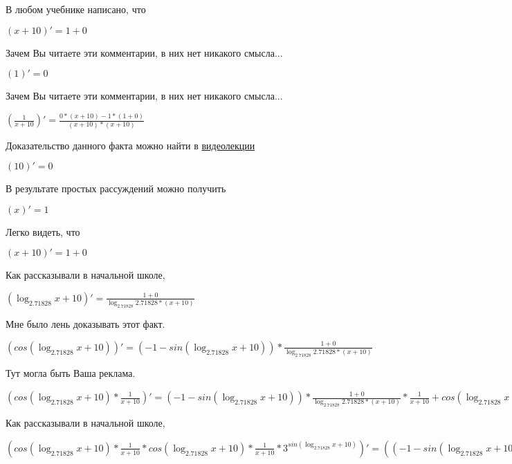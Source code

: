 \documentclass[12pt,a4paper,fleqn]{article}
\theoremstyle{definition}
\begin{document}
В любом учебнике написано, что

$( x  +  10 )' =  1  +  0 $

Зачем Вы читаете эти комментарии, в них нет никакого смысла...

$( 1 )' =  0 $

Зачем Вы читаете эти комментарии, в них нет никакого смысла...

$(\frac{ 1 }{ x  +  10 }
)' = \frac{ 0  * ( x  +  10 ) -  1  * ( 1  +  0 )}{( x  +  10 ) * ( x  +  10 )}
$

Доказательство данного факта можно найти в \href{https://www.youtube.com/watch?v=dQw4w9WgXcQ}{видеолекции}

$( 10 )' =  0 $

В результате простых рассуждений можно получить

$( x )' =  1 $

Легко видеть, что

$( x  +  10 )' =  1  +  0 $

Как рассказывали в начальной школе,

$(\log_{ 2.71828 }{ x  +  10 })' = \frac{ 1  +  0 }{\log_{ 2.71828 }{ 2.71828 } * ( x  +  10 )}
$

Мне было лень доказывать этот факт.

$(cos(\log_{ 2.71828 }{ x  +  10 }))' = ( -1  - sin(\log_{ 2.71828 }{ x  +  10 })) * \frac{ 1  +  0 }{\log_{ 2.71828 }{ 2.71828 } * ( x  +  10 )}
$

Тут могла быть Ваша реклама.

$(cos(\log_{ 2.71828 }{ x  +  10 }) * \frac{ 1 }{ x  +  10 }
)' = ( -1  - sin(\log_{ 2.71828 }{ x  +  10 })) * \frac{ 1  +  0 }{\log_{ 2.71828 }{ 2.71828 } * ( x  +  10 )}
 * \frac{ 1 }{ x  +  10 }
 + cos(\log_{ 2.71828 }{ x  +  10 }) * \frac{ 0  * ( x  +  10 ) -  1  * ( 1  +  0 )}{( x  +  10 ) * ( x  +  10 )}
$

Как рассказывали в начальной школе,

$(cos(\log_{ 2.71828 }{ x  +  10 }) * \frac{ 1 }{ x  +  10 }
 * cos(\log_{ 2.71828 }{ x  +  10 }) * \frac{ 1 }{ x  +  10 }
 * { 3 }^{sin(\log_{ 2.71828 }{ x  +  10 })})' = (( -1  - sin(\log_{ 2.71828 }{ x  +  10 })) * \frac{ 1  +  0 }{\log_{ 2.71828 }{ 2.71828 } * ( x  +  10 )}
 * \frac{ 1 }{ x  +  10 }
 + cos(\log_{ 2.71828 }{ x  +  10 }) * \frac{ 0  * ( x  +  10 ) -  1  * ( 1  +  0 )}{( x  +  10 ) * ( x  +  10 )}
) * cos(\log_{ 2.71828 }{ x  +  10 }) * \frac{ 1 }{ x  +  10 }
 * { 3 }^{sin(\log_{ 2.71828 }{ x  +  10 })} + cos(\log_{ 2.71828 }{ x  +  10 }) * \frac{ 1 }{ x  +  10 }
 * ((( -1  - sin(\log_{ 2.71828 }{ x  +  10 })) * \frac{ 1  +  0 }{\log_{ 2.71828 }{ 2.71828 } * ( x  +  10 )}
 * \frac{ 1 }{ x  +  10 }
 + cos(\log_{ 2.71828 }{ x  +  10 }) * \frac{ 0  * ( x  +  10 ) -  1  * ( 1  +  0 )}{( x  +  10 ) * ( x  +  10 )}
) * { 3 }^{sin(\log_{ 2.71828 }{ x  +  10 })} + cos(\log_{ 2.71828 }{ x  +  10 }) * \frac{ 1 }{ x  +  10 }
 * \log_{ 2.71828 }{ 3 } * cos(\log_{ 2.71828 }{ x  +  10 }) * \frac{ 1  +  0 }{\log_{ 2.71828 }{ 2.71828 } * ( x  +  10 )}
 * { 3 }^{sin(\log_{ 2.71828 }{ x  +  10 })})$
\end{document}
